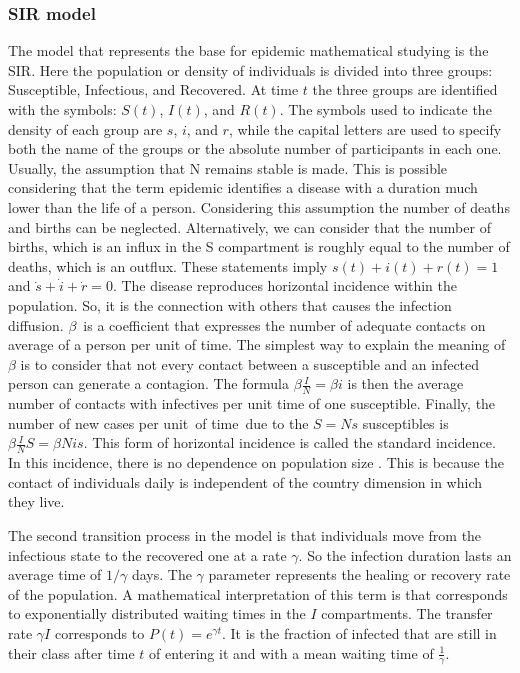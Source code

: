 \subsubsection{SIR model}
\label{subsec:SIR}
The model that represents the base for epidemic mathematical studying is the SIR.  Here the population or density of individuals is divided into three groups: Susceptible, Infectious, and Recovered. At time $t$ the three groups are identified with the symbols: $S(t)$, $I(t)$, and $R(t)$. 
The symbols used to indicate the density of each group are $s$, $i$, and $r$, while the capital letters are used to specify both the name of the groups or the absolute number of participants in each one. 
Usually, the assumption that N remains stable is made. This is possible considering that the term epidemic identifies a disease with a duration much lower than the life of a person. Considering this assumption the number of deaths and births can be neglected. Alternatively, we can consider that the number of births, which is an influx in the S compartment is roughly equal to the number of deaths, which is an outflux. These statements imply $s(t) + i(t) + r(t)= 1$ and $\dot{s}+ \dot{i} + \dot{r}= 0$.
The disease reproduces horizontal incidence within the population. So, it is the connection with others that causes the infection diffusion. 
$\beta$ is a coefficient that expresses the number of adequate contacts on average of a person per unit of time. The simplest way to explain the meaning of $\beta$ is to consider that not every contact between a susceptible and an infected person can generate a contagion. The formula  $\beta \frac{I}{N} = \beta i$ is then the average number of contacts with infectives per unit time of one susceptible. Finally, the number of new cases per unit of time due to the $S = N s$  susceptibles is $\beta \frac{I}{N} S = \beta N i s$. This form of horizontal incidence is called the standard
incidence. In this incidence, there is no dependence on population size \cite{Hethcote_2000}. This is because the contact of individuals daily is independent of the country dimension in which they live. 

The second transition process in the model is that individuals move from the infectious state to the recovered one at a rate $\gamma$. So the infection duration lasts an average time of $1/\gamma$ days. The $\gamma$ parameter represents the healing or recovery rate of the population. A mathematical interpretation of this term is that  
corresponds to exponentially distributed waiting times in the $I$ compartments. The transfer rate $\gamma I$ corresponds to $P(t) = e^{\gamma t}$. It is the fraction of infected that are still in their class after time $t$ of entering it and with a mean waiting time of $\frac{1}{\gamma}$.


